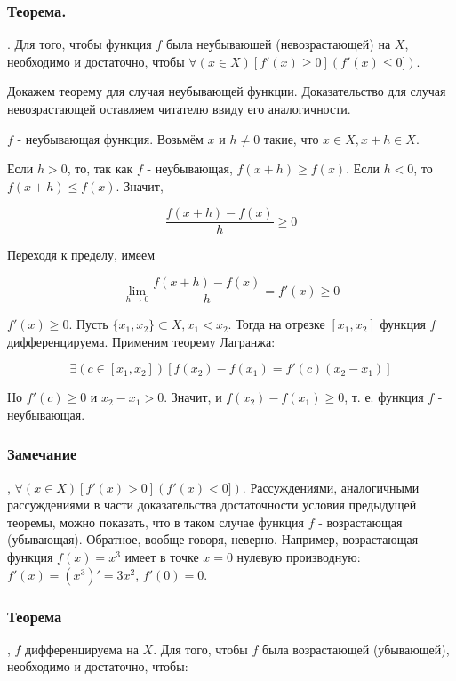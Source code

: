 \subsubsection{Теорема.}

\fXR.
Для того, чтобы функция $f$ была неубываюшей (невозрастающей) на $X$, необходимо и достаточно, чтобы
$\forall(x \in X) [f'(x) \geq 0] (f'(x) \leq 0])$.

\dokvo 

Докажем теорему для случая неубывающей функции. Доказательство для случая невозрастающей оставляем читателю ввиду его аналогичности.

\neobh

$f$ - неубывающая функция. Возьмём $x$ и $h \neq 0$ такие, что $x\in X, x+h \in X$.

Если $h>0$, то, так как $f$ - неубывающая, $f(x+h) \geq f(x)$.
Если $h<0$, то $f(x+h) \leq f(x)$.
Значит, 

$$
\frac{ f(x+h) - f(x) }{ h } \geq 0
$$

Переходя к пределу, имеем

\[
\lim_{h\to 0} { \frac{ f(x+h) - f(x) }{ h } } = f'(x) \geq 0
\]

\dost

$f'(x) \geq 0$. Пусть $\{x_1,x_2\} \subset X, x_1 < x_2$.
Тогда на отрезке $[x_1, x_2]$ функция $f$ дифференцируема. Применим теорему Лагранжа:

$$
\exists(c \in [ x_1, x_2 ]) [f(x_2) - f(x_1) = f'(c)(x_2 - x_1)]
$$

Но $f'(c) \geq 0$ и $x_2 - x_1 > 0$. Значит, и $f(x_2) - f(x_1) \geq 0$, т. е. функция $f$ - неубывающая.

\dokno


\subsubsection{Замечание}
\fXR, $\forall(x \in X) [f'(x) > 0] (f'(x) < 0])$.
Рассуждениями, аналогичными рассуждениями в части доказательства достаточности условия предыдущей теоремы, можно показать, что в таком случае функция $f$ - возрастающая (убывающая).
Обратное, вообще говоря, неверно.
Например, возрастающая функция $f(x)=x^3$ имеет в точке $x=0$ нулевую производную:
$f'(x)=(x^3)'=3x^2$, $f'(0)=0$.

\subsubsection{Теорема}
\fXR, $f$ дифференцируема на $X$.
Для того, чтобы $f$ была возрастающей (убывающей), необходимо и достаточно, чтобы:

